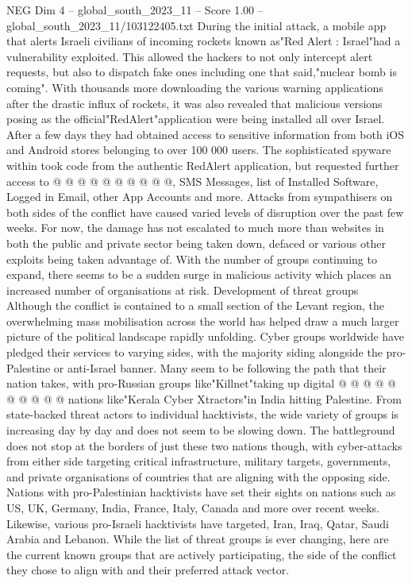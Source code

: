 \begin{textsample}{NEG Dim 4 – global\_south\_2023\_11 – Score 1.00 – global\_south\_2023\_11/103122405.txt}
During the initial attack, a mobile app that alerts Israeli civilians of incoming rockets known as"Red Alert : Israel"had a vulnerability exploited.
This allowed the hackers to not only intercept alert requests, but also to dispatch fake ones including one that said,"nuclear bomb is coming".
With thousands more downloading the various warning applications after the drastic influx of rockets, it was also revealed that malicious versions posing as the official"RedAlert"application were being installed all over Israel.
After a few days they had obtained access to sensitive information from both iOS and Android stores belonging to over 100 000 users.
The sophisticated spyware within took code from the authentic RedAlert application, but requested further access to @ @ @ @ @ @ @ @ @ @, SMS Messages, list of Installed Software, Logged in Email, other App Accounts and more.
Attacks from sympathisers on both sides of the conflict have caused varied levels of disruption over the past few weeks.
For now, the damage has not escalated to much more than websites in both the public and private sector being taken down, defaced or various other exploits being taken advantage of.
With the number of groups continuing to expand, there seems to be a sudden surge in malicious activity which places an increased number of organisations at risk.
Development of threat groups Although the conflict is contained to a small section of the Levant region, the overwhelming mass mobilisation across the world has helped draw a much larger picture of the political landscape rapidly unfolding.
Cyber groups worldwide have pledged their services to varying sides, with the majority siding alongside the pro-Palestine or anti-Israel banner.
Many seem to be following the path that their nation takes, with pro-Russian groups like"Killnet"taking up digital @ @ @ @ @ @ @ @ @ @ nations like"Kerala Cyber Xtractors"in India hitting Palestine.
From state-backed threat actors to individual hacktivists, the wide variety of groups is increasing day by day and does not seem to be slowing down.
The battleground does not stop at the borders of just these two nations though, with cyber-attacks from either side targeting critical infrastructure, military targets, governments, and private organisations of countries that are aligning with the opposing side.
Nations with pro-Palestinian hacktivists have set their sights on nations such as US, UK, Germany, India, France, Italy, Canada and more over recent weeks.
Likewise, various pro-Israeli hacktivists have targeted, Iran, Iraq, Qatar, Saudi Arabia and Lebanon.
While the list of threat groups is ever changing, here are the current known groups that are actively participating, the side of the conflict they chose to align with and their preferred attack vector.

\end{textsample}
